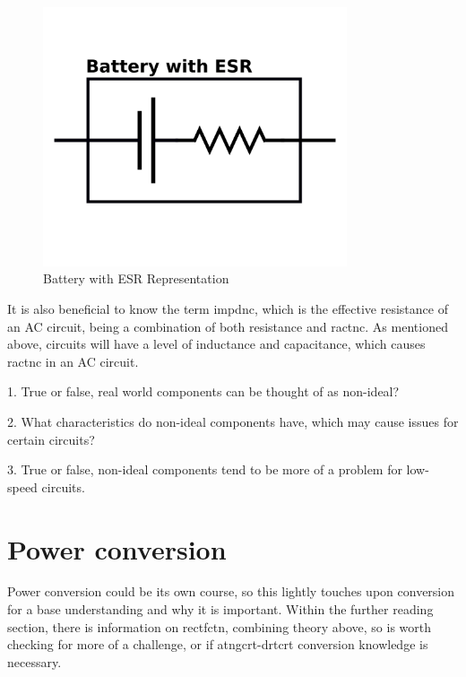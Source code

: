 \documentclass[a4paper,11pt]{report}
\newcommand{\Quiz}[1] %
{
\par\noindent %
\phantomsection %
\todo[inline, color=blue!30]{\textbf{#1}} %
\vspace{1em} %
}
\begin{document}
\begin{figure}[H]
\centering
\includegraphics[width=0.8\textwidth]{batteryesr}
\caption{Battery with ESR Representation}
\end{figure}

It is also beneficial to know the term \gls{impdnc}, which is the effective resistance of an AC circuit, being a combination of both resistance and \gls{ractnc}. As mentioned above, circuits will have a level of inductance and capacitance, which causes \gls{ractnc} in an AC circuit.

\Quiz{Quiz}

1. True or false, real world components can be thought of as non-ideal?

2. What characteristics do non-ideal components have, which may cause issues for certain circuits?

3. True or false, non-ideal components tend to be more of a problem for low-speed circuits.

\pagebreak

\section{Power conversion}

Power conversion could be its own course, so this lightly touches upon conversion for a base understanding and why it is important. Within the further reading section, there is information on \gls{rectfctn}, combining theory above, so is worth checking for more of a challenge, or if \gls{atngcrt}-\gls{drtcrt} conversion knowledge is necessary.
\end{document}
